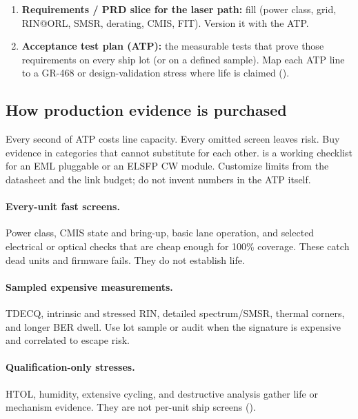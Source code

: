 \begin{enumerate}
\item \textbf{Requirements / PRD slice for the laser path:} fill
       (power class, grid, RIN@ORL, SMSR,
      derating, CMIS, FIT). Version it with the ATP.
\item \textbf{Acceptance test plan (ATP):} the measurable tests that prove those
      requirements on every ship lot (or on a defined sample). Map each ATP line to
      a GR-468 or design-validation stress where life is claimed ().
\end{enumerate}

\subsection{How production evidence is purchased}
\label{sec:atp-laser-read}

Every second of ATP costs line capacity. Every omitted screen leaves risk. Buy
evidence in categories that cannot substitute for each other.
 is a working checklist for an EML pluggable or an ELSFP CW
module. Customize limits from the datasheet and the link budget; do not invent
numbers in the ATP itself.

\paragraph{Every-unit fast screens.}
Power class, CMIS state and bring-up, basic lane operation, and selected
electrical or optical checks that are cheap enough for 100\% coverage. These
catch dead units and firmware fails. They do not establish life.

\paragraph{Sampled expensive measurements.}
TDECQ, intrinsic and stressed RIN, detailed spectrum/SMSR, thermal corners, and
longer BER dwell. Use lot sample or audit when the signature is expensive and
correlated to escape risk.

\paragraph{Qualification-only stresses.}
HTOL, humidity, extensive cycling, and destructive analysis gather life or
mechanism evidence. They are not per-unit ship screens
().

